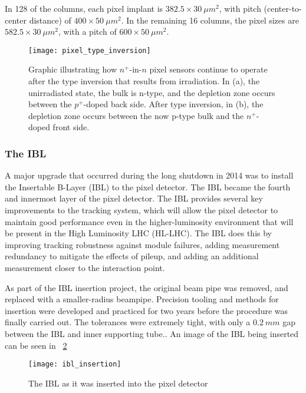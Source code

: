 In 128 of the columns, each pixel implant is $382.5\times30~\mu m^2$,
with pitch (center-to-center distance) of  $400\times50~\mu m^2$. In
the remaining 16 columns, the pixel sizes are $582.5\times30~\mu m^2$,
with a pitch of  $600\times50~\mu m^2$.\cite{pixels-2008}

\begin{figure}[h]
\texttt{[image: pixel\_type\_inversion]}
\caption{Graphic illustrating how $n^+$-in-$n$ pixel sensors continue
  to operate after the type inversion that results from
  irradiation. In (a), the unirradiated state, the bulk is n-type, and
the depletion zone occurs between the $p^+$-doped back side. After
type inversion, in (b), the depletion zone occurs between the now
p-type bulk and the $n^+$-doped front side.\cite{pixels-2008}}
\label{fig:pixel_type_inversion}
\end{figure}

\subsubsection{The IBL}
A major upgrade that occurred during the long shutdown in 2014 was to
install the Insertable B-Layer (IBL) to the pixel detector. The IBL became
the fourth and innermost layer of the pixel detector. The IBL provides
several key improvements to the tracking system, which will allow the
pixel detector to maintain good performance even in the
higher-luminosity environment that will be present in the High
Luminosity LHC (HL-LHC).\cite{ibl-tdr} The IBL does this by
improving tracking robustness against module failures, adding
measurement redundancy to mitigate the effects of pileup, and
adding an additional measurement closer to the interaction
point. \cite{ibl-tdr}

As part of the IBL insertion project, the original beam pipe was
removed, and replaced with a smaller-radius beampipe. Precision
tooling and methods for insertion were developed and practiced for two
years before the procedure was finally carried out. The tolerances
were extremely tight, with only a $0.2~mm$ gap between the IBL and
inner supporting tube.\cite{ibl-website}. An image of the IBL being inserted can be seen in
~\ref{fig:ibl_insertion}

\begin{figure}[h]
\texttt{[image: ibl\_insertion]}
\caption{The IBL as it was inserted into the pixel detector}
\label{fig:ibl_insertion}
\cite{ibl-website}
\end{figure}

